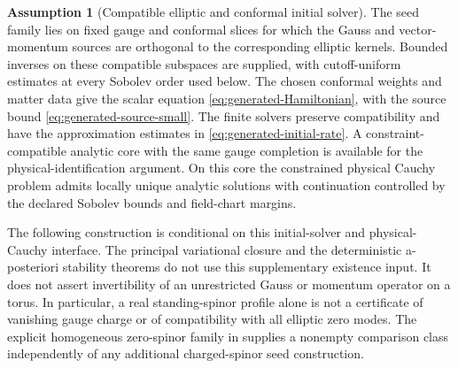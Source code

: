 \documentclass[11pt]{article}
\numberwithin{equation}{section}
\theoremstyle{definition}
\newtheorem{assumption}[assumption]{Assumption}
\theoremstyle{remark}
\begin{document}
\begin{assumption}[Compatible elliptic and conformal initial solver]
\label{ass:constrained-initial-solver}
The seed family lies on fixed gauge and conformal slices for which the
Gauss and vector-momentum sources are orthogonal to the corresponding
elliptic kernels.  Bounded inverses on these compatible subspaces are
supplied, with cutoff-uniform estimates at every Sobolev order used below.
The chosen conformal weights and matter data give the scalar equation
\eqref{eq:generated-Hamiltonian}, with the source bound
\eqref{eq:generated-source-small}.  The finite solvers preserve compatibility
and have the approximation estimates in \eqref{eq:generated-initial-rate}.
A constraint-compatible analytic core with the same gauge completion is
available for the physical-identification argument.  On this core the
constrained physical Cauchy problem admits locally unique analytic
solutions with continuation controlled by the declared Sobolev bounds
and field-chart margins.
\end{assumption}

The following construction is conditional on this initial-solver and
physical-Cauchy interface.  The principal variational closure and the
deterministic a-posteriori stability theorems do not use this supplementary
existence input.
It does not assert invertibility of an unrestricted Gauss or momentum
operator on a torus.  In particular, a real standing-spinor profile alone
is not a certificate of vanishing gauge charge or of compatibility with
all elliptic zero modes.  The explicit homogeneous zero-spinor family in
 supplies a nonempty comparison class independently
of any additional charged-spinor seed construction.
\end{document}
